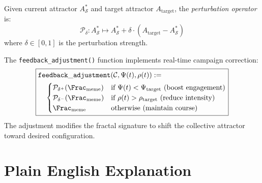 \begin{definition}
\label{def:attractor-perturbation}
Given current attractor $A_{\mathcal{S}}^*$ and target attractor $A_{\mathrm{target}}$, the \emph{perturbation operator} is:
\[
    \mathcal{P}_{\delta} : A_{\mathcal{S}}^* \mapsto A_{\mathcal{S}}^* + \delta \cdot (A_{\mathrm{target}} - A_{\mathcal{S}}^*)
\]
where $\delta \in [0, 1]$ is the perturbation strength.
\end{definition}

\begin{definition}
\label{def:feedback-adjustment}
The \texttt{feedback\_adjustment()} function implements real-time campaign correction:
\[
\boxed{
\begin{aligned}
    &\mathtt{feedback\_adjustment}(\mathcal{C}, \Psi(t), \rho(t)) := \\
    &\quad \begin{cases}
        \mathcal{P}_{\delta^+}(\Frac_{\mathrm{meme}}) & \text{if } \Psi(t) < \Psi_{\mathrm{target}}
        \text{ (boost engagement)} \\
        \mathcal{P}_{\delta^-}(\Frac_{\mathrm{meme}}) & \text{if } \rho(t) > \rho_{\mathrm{target}}
        \text{ (reduce intensity)} \\
        \Frac_{\mathrm{meme}} & \text{otherwise (maintain course)}
    \end{cases}
\end{aligned}
}
\]
The adjustment modifies the fractal signature to shift the collective attractor toward desired configuration.
\end{definition}

\section{Plain English Explanation}

